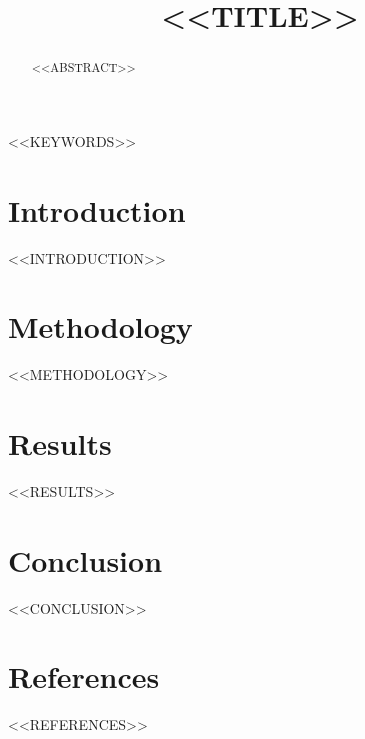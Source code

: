 \documentclass[conference]{IEEEtran}
\begin{document}
\title{<<TITLE>>}

\author{
}

\maketitle

\begin{abstract}
<<ABSTRACT>>
\end{abstract}

\begin{IEEEkeywords}
<<KEYWORDS>>
\end{IEEEkeywords}

\section{Introduction}
<<INTRODUCTION>>

\section{Methodology}
<<METHODOLOGY>>

\section{Results}
<<RESULTS>>

\section{Conclusion}
<<CONCLUSION>>

\section*{References}
<<REFERENCES>>
\end{document}
